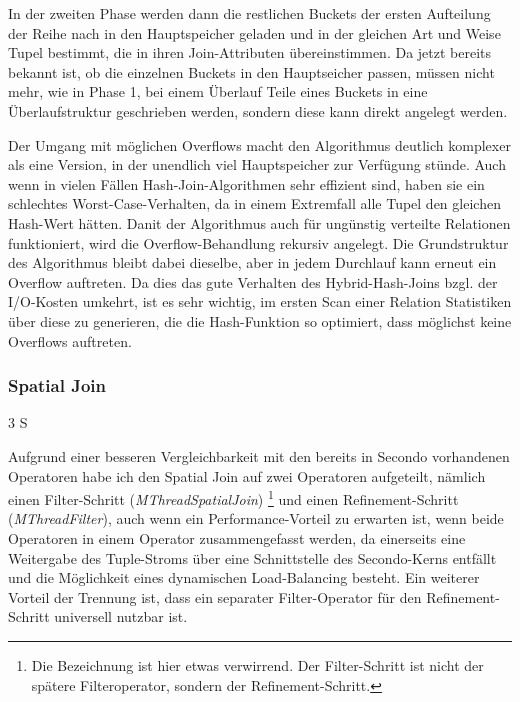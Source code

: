 \documentclass[a4paper,12pt,twoside]{article}
\newcommand{\Fb}[1]{\textit{#1}} %
\begin{document}
{In der zweiten Phase werden dann die restlichen Buckets der ersten Aufteilung der Reihe nach in den Hauptspeicher geladen und in der gleichen Art und Weise Tupel bestimmt, die in ihren Join-Attributen übereinstimmen. Da jetzt bereits bekannt ist, ob die einzelnen Buckets in den Hauptseicher passen, müssen nicht mehr, wie in Phase 1, bei einem Überlauf Teile eines Buckets in eine Überlaufstruktur geschrieben werden, sondern diese kann direkt angelegt werden.

Der Umgang mit möglichen Overflows macht den Algorithmus deutlich komplexer als eine Version, in der unendlich viel Hauptspeicher zur Verfügung stünde. Auch wenn in vielen Fällen Hash-Join-Algorithmen sehr effizient sind, haben sie ein schlechtes Worst-Case-Verhalten, da in einem Extremfall alle Tupel den gleichen Hash-Wert hätten. Danit der Algorithmus auch für ungünstig verteilte Relationen funktioniert, wird die Overflow-Behandlung rekursiv angelegt. Die Grundstruktur des Algorithmus bleibt dabei dieselbe, aber in jedem Durchlauf kann erneut ein Overflow auftreten. Da dies das gute Verhalten des Hybrid-Hash-Joins bzgl. der I/O-Kosten umkehrt, ist es sehr wichtig, im ersten Scan einer Relation Statistiken über diese zu generieren, die die Hash-Funktion so optimiert, dass möglichst keine Overflows auftreten.

\subsubsection{Spatial Join} 3 S

Aufgrund einer besseren Vergleichbarkeit mit den bereits in Secondo vorhandenen Operatoren habe ich den Spatial Join auf zwei Operatoren aufgeteilt, nämlich einen Filter-Schritt (\Fb{MThreadSpatialJoin}) \footnote{Die Bezeichnung ist hier etwas verwirrend. Der Filter-Schritt ist nicht der spätere Filteroperator, sondern der Refinement-Schritt.} und einen Refinement-Schritt (\Fb{MThreadFilter}), auch wenn ein Performance-Vorteil zu erwarten ist, wenn beide Operatoren in einem Operator zusammengefasst werden, da einerseits eine Weitergabe des Tuple-Stroms über eine Schnittstelle des Secondo-Kerns entfällt und die Möglichkeit eines dynamischen Load-Balancing besteht. Ein weiterer Vorteil der Trennung ist, dass ein separater Filter-Operator für den Refinement-Schritt universell nutzbar ist.

}
\end{document}

